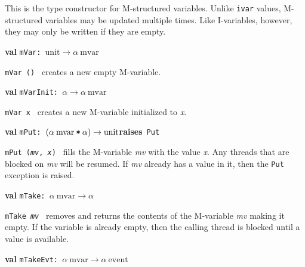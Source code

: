 \begin{descr}
\begin{speccomment}
	This is the type constructor for M-structured variables.\- 	Unlike \texttt{ivar} values, M-structured variables may be 	updated multiple times.\- 	Like I-variables, however, they may only be written if they 	are empty.\-     \end{speccomment}
\item {}{\textbf{val}} {\tt mVar: \(\mathrm{unit}\rightarrow \alpha\:\mathrm{mvar}\)}\label{val-SYNC_VAR.mVar}


\begin{speccomment}
\item {\tt m\-Var ()           } 
creates a new empty M-variable.\-     \end{speccomment}
\item {}{\textbf{val}} {\tt mVarInit: \(\alpha\rightarrow \alpha\:\mathrm{mvar}\)}\label{val-SYNC_VAR.mVarInit}


\begin{speccomment}
\item {\tt m\-Var x           } 
creates a new M-variable initialized to \textit{x}.\-     \end{speccomment}
\item {}{\textbf{val}} {\tt mPut: \((\alpha\:\mathrm{mvar}\:\verb,*,\:\alpha)\rightarrow \mathrm{unit}\)}\label{val-SYNC_VAR.mPut}\hfill\textbf{raises}~\texttt{Put}


\begin{speccomment}
\item {\tt m\-Put (\textit{mv}, \textit{x})           } 
fills the M-variable \textit{mv} with the value \textit{x}.\- 	  Any threads that are blocked on \textit{mv} will be resumed.\- 	  If \textit{mv} already has a value in it, then the \texttt{Put} 	  exception is raised.\-     \end{speccomment}
\item {}{\textbf{val}} {\tt mTake: \(\alpha\:\mathrm{mvar}\rightarrow \alpha\)}\label{val-SYNC_VAR.mTake}


\begin{speccomment}
\item {\tt m\-Take \textit{mv}         } 
removes and returns the contents of the M-variable \textit{mv} 	making it empty.\- 	If the variable is already empty, then the calling thread 	is blocked until a value is available.\-     \end{speccomment}
\item {}{\textbf{val}} {\tt mTakeEvt: \(\alpha\:\mathrm{mvar}\rightarrow \alpha\:\mathrm{event}\)}\label{val-SYNC_VAR.mTakeEvt}



\end{descr}
